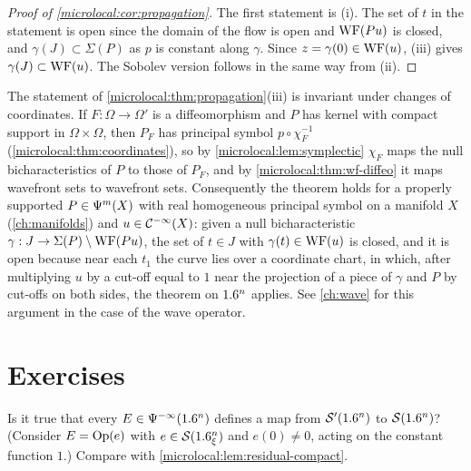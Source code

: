 \begin{proof}[Proof of \cref{microlocal:cor:propagation}]
  The first statement is (i). The set of $t$ in the statement is open since
  the domain of the flow is open and $\operatorname{WF}(Pu)$ is closed, and $\gamma(J)\subset\Sigma(P)$
  as $p$ is constant along $\gamma$. Since $z=\gamma(0)\in\operatorname{WF}(u)$, (iii) gives
  $\gamma(J)\subset\operatorname{WF}(u)$. The Sobolev version follows in the same way from (ii).
\end{proof}

\begin{remark}\label{microlocal:rem:propagation-invariance}
  The statement of \cref{microlocal:thm:propagation}(iii) is invariant under
  changes of coordinates. If $F:\Omega\to\Omega'$ is a diffeomorphism and $P$ has
  kernel with compact support in $\Omega\times\Omega$, then $P_F$ has principal
  symbol $p\circ\chi_F^{-1}$ (\cref{microlocal:thm:coordinates}), so by
  \cref{microlocal:lem:symplectic} $\chi_F$ maps the null bicharacteristics of
  $P$ to those of $P_F$, and by \cref{microlocal:thm:wf-diffeo} it maps
  wavefront sets to wavefront sets. Consequently the theorem holds for a
  properly supported $P\in\Psi^{m}(X)$ with real homogeneous principal symbol
  on a manifold $X$ (\cref{ch:manifolds}) and $u\in\mathcal{C}^{-\infty}(X)$: given a null
  bicharacteristic $\gamma:J\to\Sigma(P)\setminus\operatorname{WF}(Pu)$, the set of $t\in J$ with
  $\gamma(t)\in\operatorname{WF}(u)$ is closed, and it is open because near each $t_1$ the
  curve lies over a coordinate chart, in which, after multiplying $u$ by a
  cut-off equal to $1$ near the projection of a piece of $\gamma$ and $P$ by
  cut-offs on both sides, the theorem on $1.6^n$ applies. See \cref{ch:wave}
  for this argument in the case of the wave operator.
\end{remark}

\section{Exercises}\label{microlocal:sec:exercises}

\begin{exercise}\label{microlocal:ex:residual-S}
  Is it true that every $E\in\Psi^{-\infty}(1.6^n)$ defines a map from
  $\mathcal{S}'(1.6^n)$ to $\mathcal{S}(1.6^n)$? (Consider $E=\operatorname{Op}(e)$ with $e\in\mathcal{S}(1.6^n_\xi)$
  and $e(0)\ne0$, acting on the constant function $1$.) Compare with
  \cref{microlocal:lem:residual-compact}.
\end{exercise}

